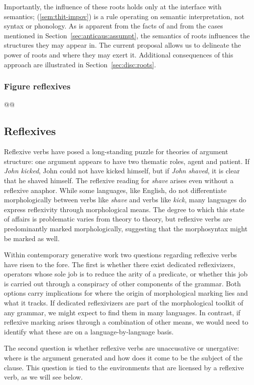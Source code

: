 Importantly, the influence of these roots holds only at the interface with semantics; (\ref{sem:thit-impov}) is a rule operating on semantic interpretation, not syntax or phonology. As is apparent from the facts of {\thit} and from the cases mentioned in Section~\ref{sec:anticaus:assumpt}, the semantics of roots influences the structures they may appear in. The current proposal allows us to delineate the power of roots and where they may exert it. Additional consequences of this approach are illustrated in Section~\ref{sec:disc:roots}.

		\subsubsection{Figure reflexives}	
@@


	\subsection{Reflexives}
	
Reflexive verbs have posed a long-standing puzzle for theories of argument structure: one argument appears to have two thematic roles, agent and patient. If \emph{John kicked}, John could not have kicked himself, but if \emph{John shaved}, it is clear that he shaved himself. The reflexive reading for \emph{shave} arises even without a reflexive anaphor. While some languages, like English, do not differentiate morphologically between verbs like \emph{shave} and verbs like \emph{kick}, many languages do express reflexivity through morphological means. The degree to which this state of affairs is problematic varies from theory to theory, but reflexive verbs are predominantly marked morphologically, suggesting that the morphosyntax might be marked as well.

Within contemporary generative work two questions regarding reflexive verbs have risen to the fore. The first is whether there exist dedicated reflexivizers, operators whose sole job is to reduce the arity of a predicate, or whether this job is carried out through a conspiracy of other components of the grammar. Both options carry implications for where the origin of morphological marking lies and what it tracks. If dedicated reflexivizers are part of the morphological toolkit of any grammar, we might expect to find them in many languages. In contrast, if reflexive marking arises through a combination of other means, we would need to identify what these are on a language-by-language basis.

The second question is whether reflexive verbs are unaccusative or unergative: where is the argument generated and how does it come to be the subject of the clause. This question is tied to the environments that are licensed by a reflexive verb, as we will see below.

